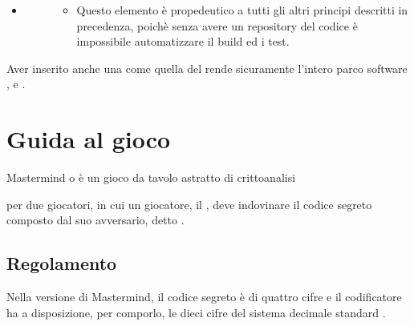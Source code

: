 \documentclass[letterpaper,10pt,italian,openany,oneside]{sphinxmanual}
\begin{document}
\begin{itemize}
\begin{description}
\begin{itemize}
\end{itemize}

\end{description}

\item {} \begin{description}
\item[{}] \leavevmode\begin{itemize}
\item {} 
Questo elemento è propedeutico a tutti gli altri principi descritti in precedenza, poichè senza avere un repository del codice è impossibile automatizzare il build ed i test.

\end{itemize}

\end{description}

\end{itemize}

Aver inserito anche una  come quella del  rende sicuramente l’intero parco software ,  e .


\chapter{Guida al gioco}
\label{\detokenize{gameguide:guida-al-gioco}}\label{\detokenize{gameguide::doc}}
Mastermind o  è un gioco da tavolo astratto di crittoanalisi %
\begin{footnote}[1]\sphinxAtStartFootnote
{}
%
\end{footnote} per due giocatori, in cui un giocatore, il ,
deve indovinare il codice segreto composto dal suo avversario, detto .


\section{Regolamento}
\label{\detokenize{gameguide:regolamento}}
Nella versione  di Mastermind, il codice segreto è di quattro cifre e il codificatore ha a disposizione, per comporlo, le dieci cifre del sistema decimale standard .
\end{document}
